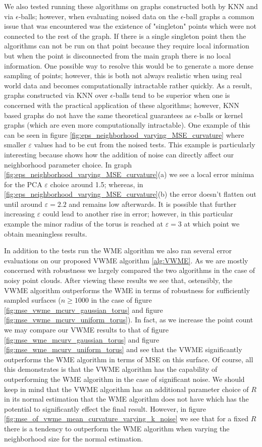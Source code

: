 \documentclass{article}
\begin{document}
We also tested running these algorithms on graphs constructed both by KNN and via $\epsilon$-balls; however, when evaluating noised data on the $\epsilon$-ball graphs a common issue that was encountered was the existence of "singleton" points which were not connected to the rest of the graph. If there is a single singleton point then the algorithms can not be run on that point because they require local information but when the point is disconnected from the main graph there is no local information. One possible way to resolve this would be to generate a more dense sampling of points; however, this is both not always realistic when using real world data and becomes computationally intractable rather quickly. As a result, graphs constructed via KNN over $\epsilon$-balls tend to be superior when one is concerned with the practical application of these algorithms; however, KNN based graphs do not have the same theoretical guarantees as $\epsilon$-balls or kernel graphs (which are even more computationally intractable). One example of this can be seen in figure \ref{fig:eps_neighborhood_varying_MSE_curvature} where smaller $\varepsilon$ values had to be cut from the noised tests. This example is particularly interesting because shows how the addition of noise can directly affect our neighborhood parameter choice. In graph \ref{fig:eps_neighborhood_varying_MSE_curvature}(a) we see a local error minima for the PCA $\varepsilon$ choice around 1.5; whereas, in \ref{fig:eps_neighborhood_varying_MSE_curvature}(b) the error doesn't flatten out until around $\varepsilon = 2.2$ and remains low afterwards. It is possible that further increasing $\varepsilon$ could lead to another rise in error; however, in this particular example the minor radius of the torus is reached at $\varepsilon = 3$ at which point we obtain meaningless results.  

In addition to the tests run the WME algorithm we also ran several error evaluations on our proposed VWME algorithm \eqref{alg:VWME}. As we are mostly concerned with robustness we largely compared the two algorithms in the case of noisy point clouds. After viewing these results we see that, ostensibly, the VWME algorithm outperforms the WME in terms of robustness for sufficiently sampled surfaces ($n \geq 1000$ in the case of figure \ref{fig:mse_vwme_mcurv_gaussian_torus} and figure \ref{fig:mse_vwme_mcurv_uniform_torus}). In fact, as we increase the point count we may compare our VWME results to that of figure \ref{fig:mse_wme_mcurv_gaussian_torus} and figure \ref{fig:mse_wme_mcurv_uniform_torus} and see that the VWME significantly outperforms the WME algorithm in terms of MSE on this surface. Of course, all this demonstrates is that the VWME algorithm has the capability of outperforming the WME algorithm in the case of significant noise. We should keep in mind that the VWME algorithm has an additional parameter choice of $R$ in its normal estimation that the WME algorithm does not have which has the potential to significantly effect the final result. However, in figure \ref{fig:mse_of_vwme_mean_curvature_varying_k_noise} we see that for a fixed $R$ there is a tendency to outperform the WME algorithm when varying the neighborhood size for the normal estimation.        
\end{document}
